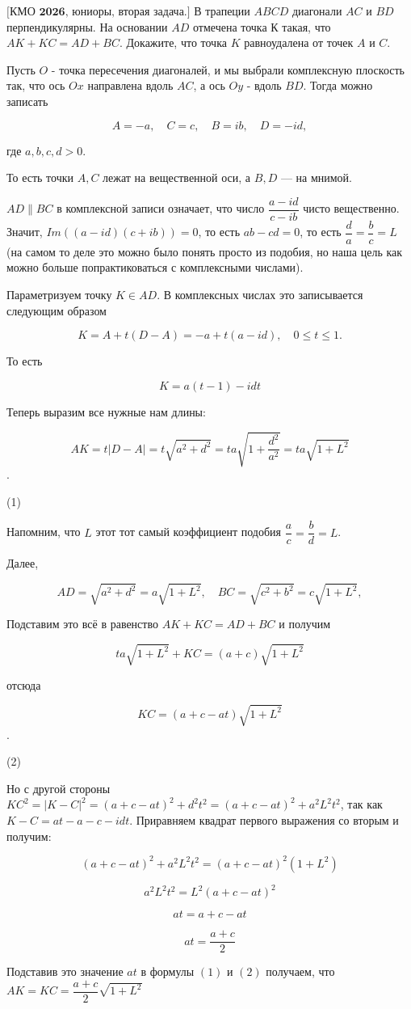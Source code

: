 \centerline{\bf \Huge }


$\bigl[\textbf{КМО 2026, юниоры, вторая задача.}\bigr]$
В трапеции $ABCD$ диагонали $AC$ и $BD$ перпендикулярны. На основании $AD$ отмечена точка К такая, что $AK+KC = AD+ BC$. Докажите, что точка $K$ равноудалена от точек $A$ и $C$.


Пусть $O$ - точка пересечения диагоналей, и мы выбрали комплексную плоскость так, что ось $O x$ направлена вдоль $A C$, а ось $O y$ - вдоль $B D$. Тогда можно записать

$$
A=-a, \quad C=c, \quad B=i b, \quad D=-i d,
$$


где $a, b, c, d>0$.

То есть точки $A, C$ лежат на вещественной оси, а $B, D$ --- на мнимой.

$A D \| B C$ в комплексной записи означает, что число $\dfrac{a-i d}{c-i b}$ чисто вещественно. Значит, $Im((a-i d)(c+i b))=0$, то есть $ab - cd = 0$, то есть $\dfrac{d}{a} = \dfrac{b}{c} = L$ (на самом то деле это можно было понять просто из подобия, но наша цель как можно больше попрактиковаться с комплексными числами).

Параметризуем точку $K\in AD$. В комплексных числах это записывается следующим образом

$$
K=A+t(D-A)=-a+t(a-i d), \quad 0 \leq t \leq 1 .
$$


То есть

$$
K=a(t-1)-i d t
$$

Теперь выразим все нужные нам длины:

$$A K=t|D-A|=t \sqrt{a^2+d^2}= ta\sqrt{1+\dfrac{d^2}{a^2}}=t a \sqrt{1+L^2}$$.

\begin{flushright}
    \vspace{-20mm}
    (1)
\end{flushright}

Напомним, что $L$ этот тот самый коэффициент подобия $\dfrac{a}{c}=\dfrac{b}{d} = L$.

Далее,

$$
A D=\sqrt{a^2+d^2}=a \sqrt{1+L^2}, \quad B C=\sqrt{c^2+b^2}=c \sqrt{1+L^2},
$$

Подставим это всё в равенство $AK+KC = AD+BC$ и получим

$$
ta\sqrt{1+L^2} + KC = (a+c)\sqrt{1+L^2}
$$

отсюда 

$$
KC = (a+c-at)\sqrt{1+L^2}
$$. 

\begin{flushright}
    \vspace{-20mm}
    (2)
\end{flushright}
Но с другой стороны $K C^2=|K-C|^2=(a+c-a t)^2+d^2 t^2=(a+c-a t)^2+a^2 L^2 t^2$, так как $K-C = at - a - c - idt$. Приравняем квадрат первого выражения со вторым и получим:

$$
(a+c-a t)^2+a^2 L^2 t^2=(a+c-a t)^2\left(1+L^2\right)
$$

$$
a^2 L^2 t^2=L^2(a+c-a t)^2
$$

$$
a t=a+c-a t
$$

$$
at= \dfrac{a+c}{2}
$$

Подставив это значение $at$ в формулы $(1)$ и $(2)$ получаем, что $AK=KC = \dfrac{a+c}{2}\sqrt{1+L^2}$